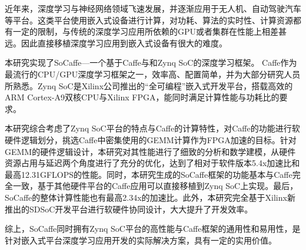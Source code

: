 
\begin{cabstract}
近年来，深度学习与神经网络领域飞速发展，并逐渐应用于无人机、自动驾驶汽车等平台。这类平台使用嵌入式设备进行计算，对功耗、算法的实时性、计算资源都有一定的限制，与传统的深度学习应用所依赖的GPU或者集群在性能上相差甚远。因此直接移植深度学习应用到嵌入式设备有很大的难度。

本研究实现了SoCaffe—一个基于Caffe与和Zynq SoC的深度学习框架。
Caffe作为最流行的CPU/GPU深度学习框架之一，效率高、配置简单，并为大部分研究人员所熟悉。Zynq SoC是Xilinx公司推出的“全可编程”嵌入式开发平台，搭载高效的ARM Cortex-A9双核CPU与Xilinx FPGA，能同时满足计算性能与功耗比的要求。

本研究综合考虑了Zynq SoC平台的特点与Caffe的计算特性，对Caffe的功能进行软硬件逻辑划分，挑选Caffe中密集使用的GEMM计算作为FPGA加速的目标。针对GEMM的硬件逻辑设计，本研究对其性能进行了细致的分析和数学建模，从硬件资源占用与延迟两个角度进行了充分的优化，达到了相对于软件版本5.4x加速比和最高12.31GFLOPS的性能。同时，本研究生成的SoCaffe框架的功能基本与Caffe完全一致，基于其他硬件平台的Caffe应用可以直接移植到Zynq SoC上实现。最后，SoCaffe的整体计算性能也有最高2.34x的加速比。此外，本研究完全基于Xilinx新推出的SDSoC开发平台进行软硬件协同设计，大大提升了开发效率。

综上，SoCaffe同时拥有Zynq SoC平台的高性能与Caffe框架的通用性和易用性，是针对嵌入式平台深度学习应用开发的实际解决方案，具有一定的实用价值。

\end{cabstract}

